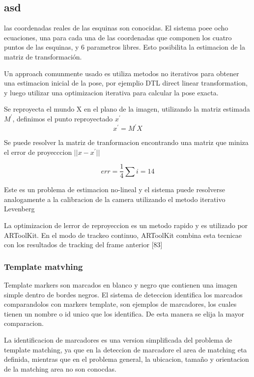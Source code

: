 \documentclass[runningheads]{llncs}
\begin{document}
\subsection{asd}
las coordenadas reales de las esquinas son conocidas. El sistema poee ocho ecuaciones, una para cada una de las coordenadas que componen los cuatro puntos de las esquinas, y 6 parametros libres. Esto posibilita la estimacion de la matriz de transformación.

Un approach comunmente usado es utiliza metodos no iterativos para obtener una estimacion inicial de la pose, por ejemplio DTL direct linear transformation, y luego utilizar una optimizacion iterativa para calcular la pose exacta.

Se reproyecta el mundo X en el plano de la imagen, utilizando la matriz estimada $M^{'}$, definimos el punto reproyectado $x^{'}$
\begin{equation}
x^{'}= M^{'}X
\end{equation}

Se puede resolver la matriz de tranformacion encontrando una matriz que miniza el error de proyecccion $||x - x^{'}||$ 

\begin{equation}
err = \frac{1}{4} \sum {i=1}{4}
\end{equation}

Este es un problema de estimacion no-lineal y el sistema puede resolverse analogamente a la calibracion de la camera utilizando el metodo iterativo Levenberg

La optimizacion de lerror de reproyeccion es un metodo rapido y es utilizado por ARToolKit. En el modo de trackeo continuo, ARToolKit combina esta tecnicae con los resultados de tracking del frame anterior [83]

\subsubsection{Template matvhing}
Template markers son marcados en blanco y negro que contienen una imagen simple dentro de bordes negros. El sistema de deteccion identifica los marcados comparandolos con markers template, son ejemplos de marcadores, los cuales tienen un nombre o id unico que los identifica. De esta manera se elija la mayor comparacion.

La identificacion de marcadores es una version simplificada del problema de template matching, ya que en la deteccion de marcadore el area de matching eta definida, mientras que en el problema general, la ubicacion, tamaño y orientacion de la matching area no son conocdas.
\end{document}
